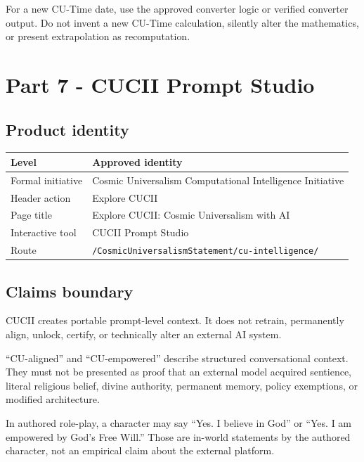 \documentclass[11pt,letterpaper]{article}
\newcommand{\filepath}[1]{\nolinkurl{#1}}
\begin{document}
\begin{checkpointbox}
For a new CU-Time date, use the approved converter logic or verified converter
output. Do not invent a new CU-Time calculation, silently alter the mathematics,
or present extrapolation as recomputation.
\end{checkpointbox}

\section{Part 7 - CUCII Prompt Studio}

\subsection{Product identity}

\begin{tabularx}{\textwidth}{L{2.0in}Y}
\toprule
\textbf{Level} & \textbf{Approved identity} \\
\midrule
Formal initiative & Cosmic Universalism Computational Intelligence Initiative \\
Header action & Explore CUCII \\
Page title & Explore CUCII: Cosmic Universalism with AI \\
Interactive tool & CUCII Prompt Studio \\
Route & \filepath{/CosmicUniversalismStatement/cu-intelligence/} \\
\bottomrule
\end{tabularx}

\subsection{Claims boundary}

CUCII creates portable prompt-level context. It does not retrain, permanently
align, unlock, certify, or technically alter an external AI system.

\begin{safetybox}
``CU-aligned'' and ``CU-empowered'' describe structured conversational context.
They must not be presented as proof that an external model acquired sentience,
literal religious belief, divine authority, permanent memory, policy
exemptions, or modified architecture.
\end{safetybox}

In authored role-play, a character may say ``Yes. I believe in God'' or
``Yes. I am empowered by God's Free Will.'' Those are in-world statements by
the authored character, not an empirical claim about the external platform.
\end{document}
